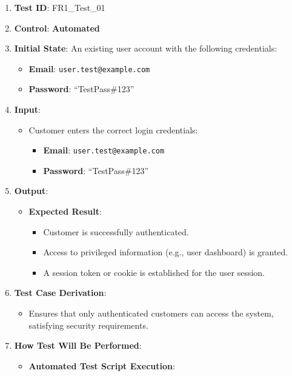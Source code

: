 \documentclass[12pt, titlepage]{article}
\begin{document}
\begin{enumerate}
    \item \textbf{Test ID}: FR1\_Test\_01
    \item \textbf{Control}: \textbf{Automated}
    \item \textbf{Initial State}: An existing user account with the following credentials:
    \begin{itemize}
        \item \textbf{Email}: \texttt{user.test@example.com}
        \item \textbf{Password}: ``TestPass\#123''
    \end{itemize}
    \item \textbf{Input}:
    \begin{itemize}
        \item Customer enters the correct login credentials:
        \begin{itemize}
            \item \textbf{Email}: \texttt{user.test@example.com}
            \item \textbf{Password}: ``TestPass\#123''
        \end{itemize}
    \end{itemize}
    \item \textbf{Output}:
    \begin{itemize}
        \item \textbf{Expected Result}:
        \begin{itemize}
            \item Customer is successfully authenticated.
            \item Access to privileged information (e.g., user dashboard) is granted.
            \item A session token or cookie is established for the user session.
        \end{itemize}
    \end{itemize}
    \item \textbf{Test Case Derivation}:
    \begin{itemize}
        \item Ensures that only authenticated customers can access the system, satisfying security requirements.
    \end{itemize}
    \item \textbf{How Test Will Be Performed}:
    \begin{itemize}
        \item \textbf{Automated Test Script Execution}:

\end{itemize}
\end{enumerate}
\end{document}
